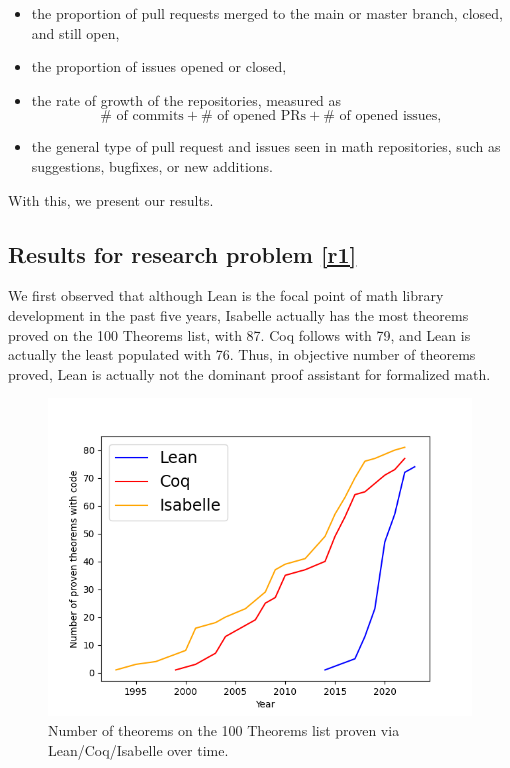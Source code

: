\documentclass[sigconf,nonacm]{acmart}
\begin{document}
\begin{itemize}
  \item the proportion of pull requests merged to the main or master branch, closed, and still open,
  \item the proportion of issues opened or closed,
  \item the rate of growth of the repositories, measured as
  \begin{equation}\label{eq1}
    \#\text{ of commits}+\#\text{ of opened PRs}+\#\text{ of opened issues},
  \end{equation} 
  \item the general type of pull request and issues seen in math repositories, such as suggestions, bugfixes, or new additions.
\end{itemize}

With this, we present our results.

\subsection{Results for research problem \ref{r1}}

We first observed that although Lean is the focal point of math library development in the past five years, Isabelle actually has the most theorems proved on the 100 Theorems list, with 87. Coq follows with 79, and Lean is actually the least populated with 76. Thus, in objective number of theorems proved, Lean is actually not the dominant proof assistant for formalized math. 

\begin{figure}[H]
  \includegraphics[scale=0.5]{thm_dev.png}
  \caption{Number of theorems on the 100 Theorems list proven via Lean/Coq/Isabelle over time.}
  \label{thms over time}
\end{figure}
\end{document}
